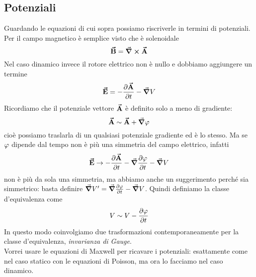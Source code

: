 \subsection{Potenziali}
Guardando le equazioni di cui sopra possiamo riscriverle in termini di potenziali.\\
Per il campo magnetico è semplice visto che è solenoidale
\begin{equation*}
	\vb*{\va{B}}=\curl\vb*{\va{A}}
\end{equation*}
Nel caso dinamico invece il rotore elettrico non è nullo e dobbiamo aggiungere un termine
\begin{equation*}
	\vb*{\va{E}}=-\pdv{\vb*{\va{A}}}{t}-\grad V	
\end{equation*}
Ricordiamo che il potenziale vettore $\vb*{\va{A}}$ è definito solo a meno di gradiente: 
\begin{equation*}
	\vba A\sim\vba A+\grad\oldphi
\end{equation*}
cioè possiamo traslarla di un qualsiasi potenziale gradiente ed è lo stesso. Ma se $\oldphi$ dipende dal tempo non è più una simmetria del campo elettrico, infatti
\begin{equation*} 
	\vba E\rightarrow -\pdv{\vba A}{t}-\grad\pdv{\oldphi}{t}-\grad V
\end{equation*}
non è più da sola una simmetria, ma abbiamo anche un suggerimento perché sia simmetrico: basta definire $\grad V'=\grad\pdv{\oldphi}{t}-\grad V$. Quindi definiamo la classe d'equivalenza come 
\begin{equation*}
	V\sim V-\pdv{\oldphi}{t}
\end{equation*}
In questo modo coinvolgiamo due trasformazioni contemporaneamente per la classe d'equivalenza, \textit{invarianza di Gauge}.\\
Vorrei usare le equazioni di Maxwell per ricavare i potenziali: esattamente come nel caso statico con le equazioni di Poisson, ma ora lo facciamo nel caso dinamico.\\

